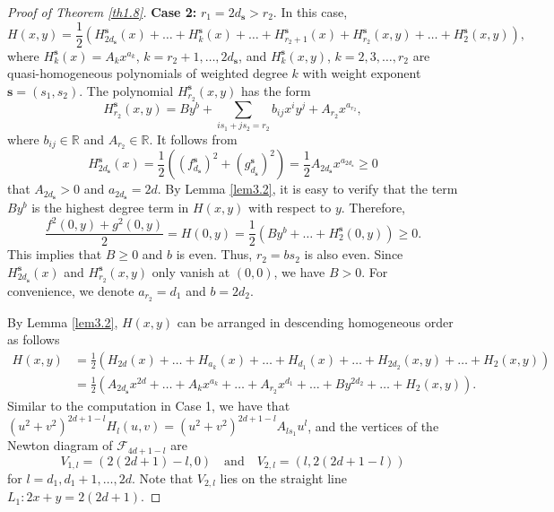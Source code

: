 \documentclass[reqno]{amsart}
\begin{document}
\begin{proof}[Proof of Theorem \ref{th1.8}]
\noindent\textbf{Case 2:}
$r_1=2d_{\mathbf{s}}>r_2$.
In this case, 
\begin{equation}\label{eq3-7}
H(x,y)=\frac{1}{2}\left(H^{\mathbf{s}}_{2d_{\mathbf{s}}}(x)+\dots
+H^{\mathbf{s}}_{k}(x)+\dots+H^{\mathbf{s}}_{r_2+1}(x)+H^{\mathbf{s}}_{r_2}(x,y)
+\dots+H^{\mathbf{s}}_{2}(x,y)\right),
\end{equation}
where $H^{\mathbf{s}}_k(x)=A_kx^{a_k}$, $k=r_2+1, \ldots, 2d_{\mathbf{s}}$, and 
$H^{\mathbf{s}}_{k}(x,y)$, $k=2,3,\ldots, r_2$ are quasi-homogeneous polynomials of 
weighted degree $k$ with weight exponent $\mathbf{s}=(s_1,s_2)$. 
The polynomial $H^{\mathbf{s}}_{r_2}(x,y)$ has the  form
\[
H^{\mathbf{s}}_{r_2}(x,y)=By^{b}+\sum_{is_1+js_2
=r_2}b_{ij}x^{i}y^{j}+A_{r_2}x^{a_{r_2}},
\]
where $b_{ij}\in \mathbb{R}$ and $A_{r_2}\in \mathbb{R}$.  It follows from
\[
H^{\mathbf{s}}_{2d_{\mathbf{s}}}(x)=
\frac{1}{2}\left(\left(f^{\mathbf{s}}_{d_{\mathbf{s}}}\right)^2
+\left(g^{\mathbf{s}}_{d_{\mathbf{s}}}\right)^2\right)
=\frac{1}{2}A_{2d_{\mathbf{s}}}x^{a_{2d_{\mathbf{s}}}}\geq 0
\]
that $A_{2d_{\mathbf{s}}}>0$ and $a_{2d_{\mathbf{s}}}=2d$. 
By Lemma \ref{lem3.2}, it is easy to verify that the term  $By^b$ is the highest 
degree term in $H(x,y)$ with respect to $y$. Therefore,
\[
\frac{f^{2}(0,y)+g^{2}(0,y)}{2}=H(0,y)=\frac{1}{2}(By^b
+\dots+H^{\mathbf{s}}_{2}(0,y))\geq 0.
\]
This implies that $B\geq 0$ and $b$ is even. Thus, $r_2=bs_2$ is also even. 
Since $H^{\mathbf{s}}_{2d_{\mathbf{s}}}(x)$ and $H^{\mathbf{s}}_{r_2}(x,y)$ only 
vanish at $(0,0)$,  we have $B>0$.  For convenience, we denote $a_{r_2}=d_1$ and 
$b=2d_2$.

By Lemma \ref{lem3.2},  $H(x,y)$  can be arranged in descending homogeneous order as 
follows
\begin{align*}
    H(x,y)&=\frac{1}{2}\left(H_{2d}(x)\!+\!\dots\!+\!H_{a_k}(x)\!+\!\dots\!+\!H_{d_1}(x)\!+\!\dots\!+\!H_{2d_2}(x,y)\!+\!\dots\!+\!H_2(x,y)\right)\\
&=\frac{1}{2}\left(A_{2d_{\mathbf{s}}}x^{2d}+\dots+A_{k}x^{a_{k}}+\dots+A_{r_2}x^{d_1}+\dots+By^{2d_2}+\dots+H_2(x,y)\right).
\end{align*}
Similar to the computation in Case 1, we have that  
$(u^2+v^2)^{2d+1-l}H_{l}(u,v)=(u^2+v^2)^{2d+1-l}A_{ls_1}u^l$, and the vertices of the 
Newton diagram of $\mathcal{F}_{4d+1-l}$ are
\[
V_{1,l}=(2(2d+1)-l,0) \quad \text{and} \quad V_{2,l}=(l,2(2d+1-l))
\]
for $l=d_1, d_1+1, \ldots, 2d$.
Note that $V_{2,l}$ lies on the straight line $L_1:2x+y=2(2d+1)$.


\end{proof}
\end{document}
